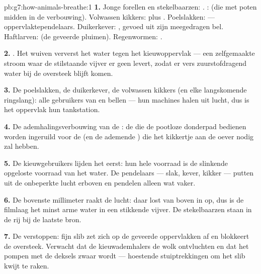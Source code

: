 \begin{solution}{pb:g7:how-animals-breathe:1}
\textbf{1.} Jonge forellen en stekelbaarzen: . :
 (die met poten midden in de verbouwing). Volwassen kikkers:
 plus . Poelslakken:  --- oppervlaktependelaars.
Duikerkever: , gevoed uit zijn meegedragen bel. Haftlarven:
 (de geveerde pluimen). Regenwormen: .

\textbf{2.} . Het wuiven ververst het water tegen het
kieuwoppervlak --- een zelfgemaakte stroom waar de stilstaande vijver er
geen levert, zodat er vers zuurstofdragend water bij de oversteek blijft
komen.

\textbf{3.} De poelslakken, de duikerkever, de volwassen kikkers (en elke
langskomende ringslang): alle gebruikers van  en bellen --- hun
machines halen  uit lucht, dus is het oppervlak hun tankstation.

\textbf{4.} De ademhalingsverbouwing van de : de
 die de pootloze donderpad bedienen worden ingeruild voor de
 (en de ademende ) die het kikkertje aan de oever nodig zal
hebben.

\textbf{5.} De kieuwgebruikers lijden het eerst: hun hele voorraad is de
slinkende opgeloste voorraad van het water. De pendelaars --- slak, kever,
kikker --- putten uit de onbeperkte lucht erboven en pendelen alleen wat
vaker.

\textbf{6.} De bovenste millimeter raakt de lucht: daar lost  van
boven in op, dus is de filmlaag het minst arme water in een stikkende
vijver. De stekelbaarzen staan in de rij bij de laatste bron.

\textbf{7.} De  verstoppen: fijn slib zet zich op de geveerde
oppervlakken af en blokkeert de oversteek. Verwacht dat de
kieuwademhalers de wolk ontvluchten en dat het pompen met de deksels
zwaar wordt --- hoestende stuiptrekkingen om het slib kwijt te raken.


\end{solution}
